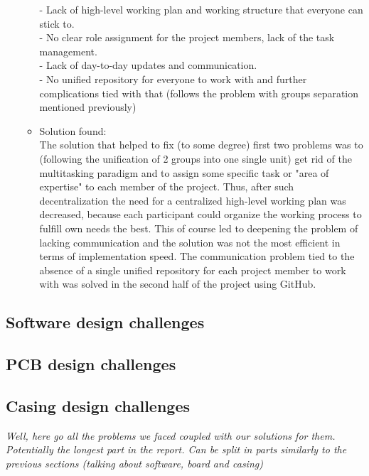 \begin{enumerate}
\begin{itemize}
        - Lack of high-level working plan and working structure that everyone can stick to.\\
        - No clear role assignment for the project members, lack of the task management.\\
        - Lack of day-to-day updates and communication.\\
        - No unified repository for everyone to work with and further complications tied with that (follows the problem with groups separation mentioned previously)
      \item Solution found:\\
        The solution that helped to fix (to some degree) first two problems was to (following the unification of 2 groups into one single unit) get rid of the multitasking paradigm  and to assign some specific task or "area of expertise" to each member of the project. Thus, after such decentralization the need for a centralized high-level working plan was decreased, because each participant could organize the working process to fulfill own needs the best. This of course led to deepening the problem of lacking communication and the solution was not the most efficient in terms of implementation speed. 
        The communication problem tied to the absence of a single unified repository for each project member to work with was solved in the second half of the project using GitHub.

  \end{itemize}
\end{enumerate}

\subsection{Software design challenges}
\subsection{PCB design challenges}
\subsection{Casing design challenges}

\textit{Well, here go all the problems we faced coupled with our solutions for them. Potentially the longest part in the report. Can be split in parts similarly to the previous sections (talking about software, board and casing)}

